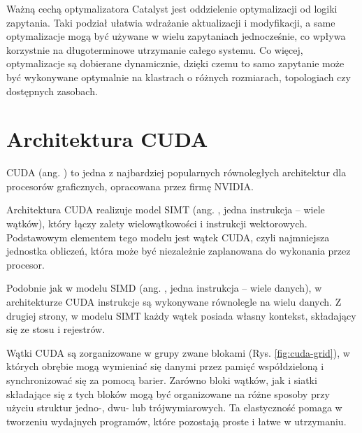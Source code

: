 Ważną cechą optymalizatora Catalyst jest oddzielenie optymalizacji od logiki zapytania. Taki
podział ułatwia wdrażanie aktualizacji i modyfikacji, a same optymalizacje mogą być używane
w wielu zapytaniach jednocześnie, co wpływa korzystnie na długoterminowe utrzymanie całego
systemu. Co więcej, optymalizacje są dobierane dynamicznie, dzięki czemu to samo zapytanie
może być wykonywane optymalnie na klastrach o różnych rozmiarach, topologiach czy
dostępnych zasobach.

\section{Architektura CUDA}

CUDA (ang. ) to jedna z najbardziej popularnych
równoległych architektur dla procesorów graficznych, opracowana przez firmę NVIDIA.

Architektura CUDA realizuje model SIMT \cite{computer-arch} (ang. ,
jedna instrukcja -- wiele wątków), który łączy zalety wielowątkowości i instrukcji wektorowych.
Podstawowym elementem tego modelu jest wątek CUDA, czyli najmniejsza jednostka obliczeń, która
może być niezależnie zaplanowana do wykonania przez procesor.

Podobnie jak w modelu SIMD (ang. , jedna instrukcja -- wiele danych),
w architekturze CUDA instrukcje są wykonywane równolegle na wielu danych. Z drugiej strony,
w modelu SIMT każdy wątek posiada własny kontekst, składający się ze stosu i rejestrów.

Wątki CUDA są zorganizowane w grupy zwane blokami (Rys. \ref{fig:cuda-grid}), w których obrębie
mogą wymieniać się danymi przez pamięć współdzieloną i synchronizować się za pomocą
barier. Zarówno bloki wątków, jak i siatki składające się z tych bloków mogą być organizowane na
różne sposoby przy użyciu struktur jedno-, dwu- lub trójwymiarowych. Ta elastyczność pomaga w
tworzeniu wydajnych programów, które pozostają proste i łatwe w utrzymaniu.

